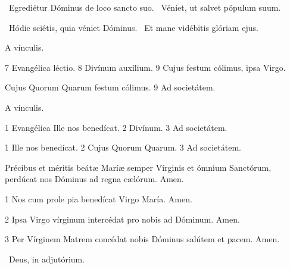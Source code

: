 
\V\ Egrediétur Dóminus de loco sancto suo. \R\ Véniet, ut salvet pópulum suum.


\V\ Hódie sciétis, quia véniet Dóminus. \R\ Et mane vidébitis glóriam ejus.


 A vínculis.

 7 Evangélica léctio. 8  Divínum auxílium.
9  Cujus festum cólimus, ipsa Virgo.

 Cujus  Quorum  Quarum\rubric{)} festum cólimus. 9 Ad societátem. 


 A vínculis.

  1 Evangélica  Ille nos benedícat. 2 Divínum. 3 Ad societátem.


 1 Ille nos benedícat. 2 Cujus  Quorum  Quarum\rubric{)}. 3 Ad societátem.


 Précibus et méritis beátæ Maríæ semper Vírginis et ómnium Sanctórum, perdúcat nos Dóminus ad regna cælórum. Amen.

 1 Nos cum prole pia benedícat Virgo María. Amen.

2 Ipsa Virgo vírginum intercédat pro nobis ad Dóminum. Amen.

3 Per Vírginem Matrem concédat nobis Dóminus salútem et pacem. Amen.

\sectionornament


\textit{}


\V\ Deus, in adjutórium.

